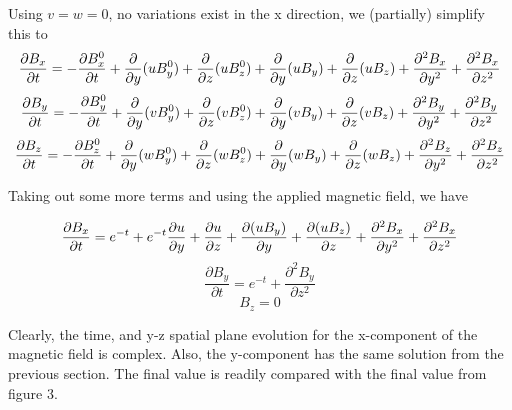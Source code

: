 \documentclass[11pt]{article}
\begin{document}
Using $v=w=0$, no variations exist in the x direction, we (partially) simplify this to
\begin{equation}
	\frac{\partial B_x}{\partial t} 
	=
	-\frac{\partial B_x^0}{\partial t}
	+\frac{\partial}{\partial y} (u B_y^0) 
	+\frac{\partial}{\partial z} (u B_z^0) \\
	+\frac{\partial}{\partial y} (u B_y) 
	+\frac{\partial}{\partial z} (u B_z) 
	+\frac{\partial^2 B_x}{\partial y^2} 
	+\frac{\partial^2 B_x}{\partial z^2} 
\end{equation}
\begin{equation}
	\frac{\partial B_y}{\partial t} 
	=
	-\frac{\partial B_y^0}{\partial t}
	+\frac{\partial}{\partial y} (v B_y^0) 
	+\frac{\partial}{\partial z} (v B_z^0) \\
	+\frac{\partial}{\partial y} (v B_y) 
	+\frac{\partial}{\partial z} (v B_z) 
	+\frac{\partial^2 B_y}{\partial y^2} 
	+\frac{\partial^2 B_y}{\partial z^2} 
\end{equation}
\begin{equation}
	\frac{\partial B_z}{\partial t} 
	=
	-\frac{\partial B_z^0}{\partial t}
	+\frac{\partial}{\partial y} (w B_y^0) 
	+\frac{\partial}{\partial z} (w B_z^0) \\
	+\frac{\partial}{\partial y} (w B_y) 
	+\frac{\partial}{\partial z} (w B_z) 
	+\frac{\partial^2 B_z}{\partial y^2} 
	+\frac{\partial^2 B_z}{\partial z^2} 
\end{equation}

Taking out some more terms and using the applied magnetic field, we have

\begin{equation}
	\frac{\partial B_x}{\partial t} 
	=
	e^{-t}
	+e^{-t}\frac{\partial u}{\partial y} 
	+\frac{\partial u}{\partial z} \\
	+\frac{\partial (u B_y)}{\partial y} 
	+\frac{\partial (u B_z)}{\partial z} 
	+\frac{\partial^2 B_x}{\partial y^2} 
	+\frac{\partial^2 B_x}{\partial z^2} 
\end{equation}
\begin{equation}
	\frac{\partial B_y}{\partial t} 
	=
	e^{-t}
	+\frac{\partial^2 B_y}{\partial z^2} 
\end{equation}
\begin{equation}
	B_z = 0
\end{equation}


Clearly, the time, and y-z spatial plane evolution for the x-component of the magnetic field is complex. Also, the y-component has the same solution from the previous section. The final value is readily compared with the final value from figure 3.
\end{document}
